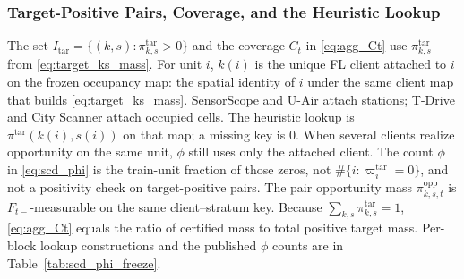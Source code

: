 \subsubsection{Target-Positive Pairs, Coverage, and the Heuristic Lookup}
\label{app:itar_lookup}
The set $I_{\mathrm{tar}}=\{(k,s):\pi^{\mathrm{tar}}_{k,s}>0\}$ and the
coverage $C_t$ in \eqref{eq:agg_Ct} use $\pi^{\mathrm{tar}}_{k,s}$ from
\eqref{eq:target_ks_mass}.  For unit $i$, $k(i)$ is the unique FL client
attached to $i$ on the frozen occupancy map: the spatial identity of $i$
under the same client map that builds \eqref{eq:target_ks_mass}.
SensorScope and U-Air attach stations; T-Drive and City Scanner attach
occupied cells.  The heuristic lookup is $\pi^{\mathrm{tar}}(k(i),s(i))$ on
that map; a missing key is $0$.  When several clients realize
opportunity on the same unit, $\phi$ still uses only the attached
client.  The count $\phi$ in \eqref{eq:scd_phi} is the train-unit
fraction of those zeros, not $\#\{i:\varpi_i^{\mathrm{tar}}=0\}$, and
not a positivity check on target-positive pairs.
The pair opportunity mass $\pi^{\mathrm{opp}}_{k,s,t}$ is
$F_{t-}$-measurable on the same client--stratum key.
Because $\sum_{k,s}\pi^{\mathrm{tar}}_{k,s}=1$, \eqref{eq:agg_Ct} equals
the ratio of certified mass to total positive target mass.
Per-block lookup constructions and the published $\phi$ counts are in
Table~\ref{tab:scd_phi_freeze}.

